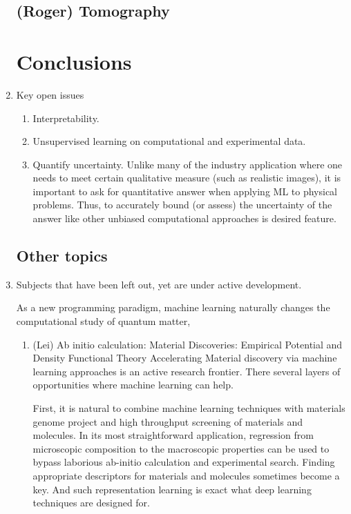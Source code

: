 \documentclass[aps,prb,floatfix,amsmath,amssymb,amsfonts,10pt,floatfix,longbibliography]{revtex4-1}
\begin{document}
\begin{enumerate}
\subsection{(Roger) Tomography}


\section{Conclusions}
\item Key open issues
	\begin{enumerate}
	\item Interpretability. 
	\item Unsupervised learning on computational and experimental data.
	\item Quantify uncertainty. Unlike many of the industry application where one needs to meet certain qualitative measure (such as realistic images), it is important to ask for quantitative answer when applying ML to physical problems. Thus, to accurately bound (or assess) the uncertainty of the answer like other unbiased computational approaches is desired feature. 
	
	\end{enumerate}
\subsection{Other topics}

\item Subjects that have been left out, yet are under active development. 

As a new programming paradigm, machine learning naturally changes the computational study of quantum matter, 
    \begin{enumerate}	
    
    \item (Lei) Ab initio calculation:  Material Discoveries: Empirical Potential and Density Functional Theory
	 Accelerating Material discovery via machine learning approaches is an active research frontier. There several layers of opportunities where machine learning can help. 

 First, it is natural to combine machine learning techniques with materials genome project and high throughput screening of materials and molecules. In its most straightforward application, regression from microscopic composition to the macroscopic properties can be used to bypass laborious ab-initio calculation and experimental search. Finding  appropriate descriptors for materials and molecules sometimes become a key. And such representation learning is exact what deep learning techniques are  designed for. 


\end{enumerate}
\end{enumerate}
\end{document}
